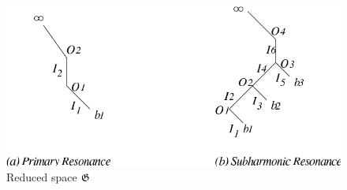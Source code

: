 \begin{figure}
\begin{center}
\includegraphics[width=\textwidth]{figures/reducespace}
\end{center}
\caption{Reduced space $\mathfrak G$}
\label{F:reducespace}
\end{figure}

